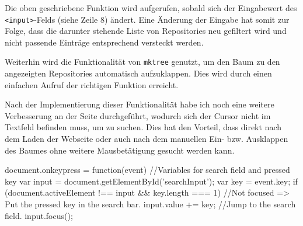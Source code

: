 \documentclass[xcolor=dvipsnames,11pt,paper=a4paper]{report}
\begin{document}

Die oben geschriebene Funktion wird aufgerufen, sobald sich der Eingabewert des
\texttt{<input>}-Felds (siehe Zeile 8) ändert. Eine Änderung der Eingabe hat somit
zur Folge, dass die darunter stehende Liste von Repositories neu gefiltert wird
und nicht passende Einträge entsprechend versteckt werden.

Weiterhin wird die Funktionalität von \texttt{mktree} genutzt, um den Baum zu den
angezeigten Repositories automatisch aufzuklappen. Dies wird durch einen einfachen
Aufruf der richtigen Funktion erreicht.

Nach der Implementierung dieser Funktionalität habe ich noch eine weitere Verbesserung
an der Seite durchgeführt, wodurch sich der Cursor nicht im Textfeld befinden muss,
um zu suchen. Dies hat den Vorteil, dass direkt nach dem Laden der Webseite oder
auch nach dem manuellen Ein- bzw. Ausklappen des Baumes ohne weitere Mausbetätigung
gesucht werden kann.

\begin{code}[language=javascript, caption={Funktion für Suche auf Tastendruck}, label={lst:svn-onkeypress}]
document.onkeypress = function(event) {
	//Variables for search field and pressed key
	var input = document.getElementById('searchInput');
	var key = event.key;
	if (document.activeElement !== input && key.length === 1) {
		//Not focused => Put the pressed key in the search bar.
		input.value += key;
	}
	//Jump to the search field.
	input.focus();
}
\end{code}
\end{document}

